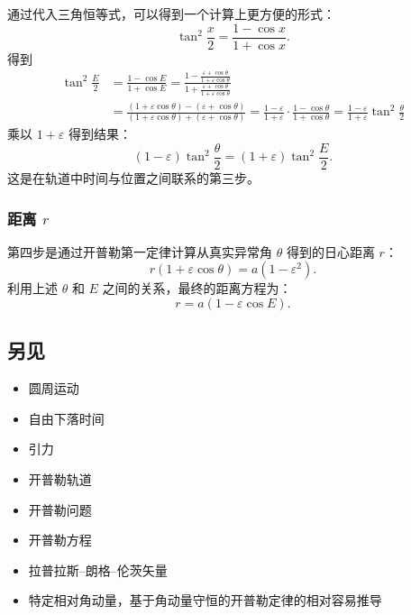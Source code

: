 通过代入三角恒等式，可以得到一个计算上更方便的形式：  
\[
\tan^2 \frac{x}{2} = \frac{1 - \cos x}{1 + \cos x}.~
\]
得到  
\begin{align}
\tan^2 \frac{E}{2} &= \frac{1 - \cos E}{1 + \cos E} = \frac{1 - \frac{\varepsilon + \cos \theta}{1 + \varepsilon \cos \theta}}{1 + \frac{\varepsilon + \cos \theta}{1 + \varepsilon \cos \theta}} \\
& = \frac{(1 + \varepsilon \cos \theta) - (\varepsilon + \cos \theta)}{(1 + \varepsilon \cos \theta) + (\varepsilon + \cos \theta)} = \frac{1 - \varepsilon}{1 + \varepsilon} \cdot \frac{1 - \cos \theta}{1 + \cos \theta} = \frac{1 - \varepsilon}{1 + \varepsilon} \tan^2 \frac{\theta}{2} ~
\end{align}
乘以 \(1 + \varepsilon\) 得到结果：  
\[
(1 - \varepsilon) \tan^2 \frac{\theta}{2} = (1 + \varepsilon) \tan^2 \frac{E}{2}.~
\]
这是在轨道中时间与位置之间联系的第三步。
\subsubsection{距离 \(r\)}  
第四步是通过开普勒第一定律计算从真实异常角 \(\theta\) 得到的日心距离 \(r\)：  
\[
r(1 + \varepsilon \cos \theta) = a(1 - \varepsilon^2).~
\]
利用上述 \(\theta\) 和 \(E\) 之间的关系，最终的距离方程为：  
\[
r = a(1 - \varepsilon \cos E).~
\]  
\subsection{另见}  
\begin{itemize}
\item 圆周运动  
\item 自由下落时间  
\item 引力  
\item 开普勒轨道  
\item 开普勒问题  
\item 开普勒方程  
\item 拉普拉斯–朗格–伦茨矢量  
\item 特定相对角动量，基于角动量守恒的开普勒定律的相对容易推导
\end{itemize} 









 
 
